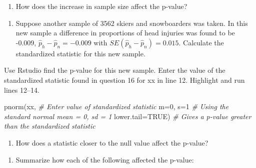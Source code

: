 \documentclass[
]{report}
\newenvironment{Shaded}{\begin{snugshade}}{\end{snugshade}}
\newcommand{\AttributeTok}[1]{\textcolor[rgb]{0.77,0.63,0.00}{#1}}
\newcommand{\CommentTok}[1]{\textcolor[rgb]{0.56,0.35,0.01}{\textit{#1}}}
\newcommand{\ConstantTok}[1]{\textcolor[rgb]{0.00,0.00,0.00}{#1}}
\newcommand{\DecValTok}[1]{\textcolor[rgb]{0.00,0.00,0.81}{#1}}
\newcommand{\FunctionTok}[1]{\textcolor[rgb]{0.00,0.00,0.00}{#1}}
\newcommand{\NormalTok}[1]{#1}
\providecommand{\tightlist}{%
  \setlength{\itemsep}{0pt}\setlength{\parskip}{0pt}}
\begin{document}
\begin{enumerate}
\def\labelenumi{\arabic{enumi}.}
\setcounter{enumi}{14}
\tightlist
\item
  How does the increase in sample size affect the p-value?
\end{enumerate}

\vspace{0.3in}

\begin{enumerate}
\def\labelenumi{\arabic{enumi}.}
\setcounter{enumi}{15}
\tightlist
\item
  Suppose another sample of 3562 skiers and snowboarders was taken. In this new sample a difference in proportions of head injuries was found to be -0.009, \(\hat{p}_h - \hat{p}_n = -0.009\) with \(SE(\hat{p}_h - \hat{p}_n) = 0.015\). Calculate the standardized statistic for this new sample.
\end{enumerate}

\vspace{0.8in}

Use Rstudio find the p-value for this new sample. Enter the value of the standardized statistic found in question 16 for xx in line 12. Highlight and run lines 12--14.

\begin{Shaded}
\begin{Highlighting}[]
\FunctionTok{pnorm}\NormalTok{(xx, }\CommentTok{\# Enter value of standardized statistic}
      \AttributeTok{m=}\DecValTok{0}\NormalTok{, }\AttributeTok{s=}\DecValTok{1} \CommentTok{\# Using the standard normal mean = 0, sd = 1}
      \AttributeTok{lower.tail=}\ConstantTok{TRUE}\NormalTok{) }\CommentTok{\# Gives a p{-}value greater than the standardized statistic}
\end{Highlighting}
\end{Shaded}

\begin{enumerate}
\def\labelenumi{\arabic{enumi}.}
\setcounter{enumi}{16}
\tightlist
\item
  How does a statistic closer to the null value affect the p-value?
\end{enumerate}

\vspace{0.3in}

\begin{enumerate}
\def\labelenumi{\arabic{enumi}.}
\setcounter{enumi}{17}
\tightlist
\item
  Summarize how each of the following affected the p-value:
\end{enumerate}
\end{document}
